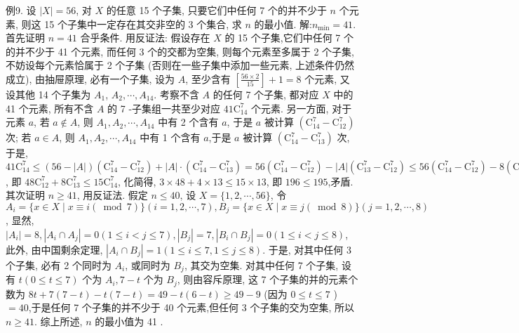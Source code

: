 例9. 设 $|X|=56$, 对 $X$ 的任意 15 个子集, 只要它们中任何 7 个的并不少于 $n$ 个元素, 则这 15 个子集中一定存在其交非空的 3 个集合, 求 $n$ 的最小值.
解:$n_{\min }=41$.
首先证明 $n=41$ 合乎条件.
用反证法: 假设存在 $X$ 的 15 个子集,它们中任何 7 个的并不少于 41 个元素, 而任何 3 个的交都为空集, 则每个元素至多属于 2 个子集, 不妨设每个元素恰属于 2 个子集 (否则在一些子集中添加一些元素, 上述条件仍然成立), 由抽屉原理, 必有一个子集, 设为 $A$, 至少含有 $\left[\frac{56 \times 2}{15}\right]+1=8$ 个元素, 又设其他 14 个子集为 $A_1$, $A_2, \cdots, A_{14}$.
考察不含 $A$ 的任何 7 个子集, 都对应 $X$ 中的 41 个元素, 所有不含 $A$ 的 7 -子集组一共至少对应 $41 \mathrm{C}_{14}^7$ 个元素.
另一方面, 对于元素 $a$, 若 $a \notin A$, 则 $A_1, A_2, \cdots, A_{14}$ 中有 2 个含有 $a$, 于是 $a$ 被计算 $\left(\mathrm{C}_{14}^7-\mathrm{C}_{12}^7\right)$ 次; 若 $a \in A$, 则 $A_1, A_2, \cdots, A_{14}$ 中有 1 个含有 $a$,于是 $a$ 被计算 $\left(\mathrm{C}_{14}^7-\mathrm{C}_{13}^7\right)$ 次, 于是, $41 \mathrm{C}_{14}^7 \leqslant(56-|A|)\left(\mathrm{C}_{14}^7-\mathrm{C}_{12}^7\right)+ |A| \cdot\left(\mathrm{C}_{14}^7-\mathrm{C}_{13}^7\right)=56\left(\mathrm{C}_{14}^7-\mathrm{C}_{12}^7\right)-|A|\left(\mathrm{C}_{13}^7-\mathrm{C}_{12}^7\right) \leqslant 56\left(\mathrm{C}_{14}^7-\mathrm{C}_{12}^7\right)- 8\left(\mathrm{C}_{13}^7-\mathrm{C}_{12}^7\right)$, 即 $48 \mathrm{C}_{12}^7+8 \mathrm{C}_{13}^7 \leqslant 15 \mathrm{C}_{14}^7$, 化简得, $3 \times 48+4 \times 13 \leqslant 15 \times 13$, 即 $196 \leqslant 195$,矛盾.
其次证明 $n \geqslant 41$, 用反证法.
假定 $n \leqslant 40$, 设 $X=\{1,2, \cdots, 56\}$, 令 $A_i=\{x \in X \mid x \equiv i(\bmod 7)\} (i=1,2, \cdots, 7), B_j=\{x \in X \mid x \equiv j(\bmod 8)\}(j=1,2, \cdots, 8)$, 显然, $\left|A_i\right|=8,\left|A_i \cap A_j\right|=0(1 \leqslant i<j \leqslant 7),\left|B_j\right|=7,\left|B_i \cap B_j\right|=0(1 \leqslant i<j \leqslant 8)$, 此外, 由中国剩余定理, $\left|A_i \cap B_j\right|=1(1 \leqslant i \leqslant 7,1 \leqslant j \leqslant 8)$. 于是, 对其中任何 3 个子集, 必有 2 个同时为 $A_i$, 或同时为 $B_j$, 其交为空集.
对其中任何 7 个子集, 设有 $t(0 \leqslant t \leqslant 7)$ 个为 $A_i, 7-t$ 个为 $B_j$, 则由容斥原理, 这 7 个子集的并的元素个数为 $8 t+7(7-t)-t(7-t)=49-t(6-t) \geqslant 49-9$ (因为 $0 \leqslant t \leqslant 7$ ) $=40$,于是任何 7 个子集的并不少于 40 个元素,但任何 3 个子集的交为空集, 所以 $n \geqslant 41$.
综上所述, $n$ 的最小值为 41 .


